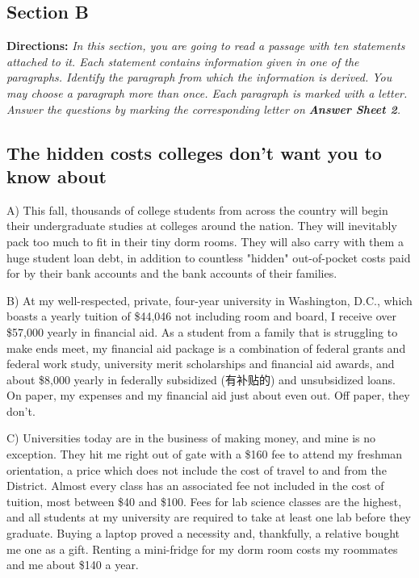\documentclass[UTF8,11pt]{ctexart}
\begin{document}
\subsection*{\textbf{Section B}}


\textbf{Directions:} \textit{In this section, you are going to read a passage with ten statements attached to it. Each statement} \textit{contains information given in one of the paragraphs. Identify the paragraph from which the information is} \textit{derived. You may choose a paragraph more than once. Each paragraph is marked with a letter. Answer the} \textit{questions by marking the corresponding letter on }\textbf{\textit{Answer Sheet 2}}\textit{.}


\subsection*{\textbf{The hidden costs colleges don't want you to know about}}


A) This fall, thousands of college students from across the country will begin their undergraduate studies at colleges around the nation. They will inevitably pack too much to fit in their tiny dorm rooms. They will also carry with them a huge student loan debt, in addition to countless "hidden" out-of-pocket costs paid for by their bank accounts and the bank accounts of their families.


B) At my well-respected, private, four-year university in Washington, D.C., which boasts a yearly tuition of \$44,046 not including room and board, I receive over \$57,000 yearly in financial aid. As a student from a family that is struggling to make ends meet, my financial aid package is a combination of federal grants and federal work study, university merit scholarships and financial aid awards, and about \$8,000 yearly in federally subsidized (有补贴的) and unsubsidized loans. On paper, my expenses and my financial aid just about even out. Off paper, they don't.


C) Universities today are in the business of making money, and mine is no exception. They hit me right out of gate with a \$160 fee to attend my freshman orientation, a price which does not include the cost of travel to and from the District. Almost every class has an associated fee not included in the cost of tuition, most between \$40 and \$100. Fees for lab science classes are the highest, and all students at my university are required to take at least one lab before they graduate. Buying a laptop proved a necessity and, thankfully, a relative bought me one as a gift. Renting a mini-fridge for my dorm room costs my roommates and me about \$140 a year.
\end{document}
